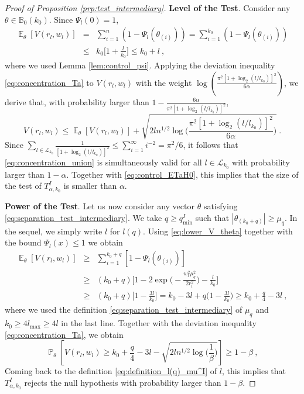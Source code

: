 \documentclass[twoside,11pt]{article}
\def\beq{\begin{equation}}
\def\eeq{\end{equation}}
\def\cL{\mathcal{L}}
\newcommand{\E}{\operatorname{\mathbb{E}}}
\renewcommand{\P}{\operatorname{\mathbb{P}}}
\newcommand{\<}{\langle}
\renewcommand{\>}{\rangle}
\begin{document}
\begin{proof}[Proof of Proposition \ref{prp:test_intermediary}]
\bigskip
\noindent 
  {\bf Level of the Test}. Consider  any $\theta\in \mathbb{B}_0(k_0)$. Since $\Psi_l(0)=1$, 
\begin{eqnarray}
\nonumber
\label{eq:control_ETaH0}
 \E_{\theta}[V(r_{l},w_l)]&=& \sum_{i=1}^{n}(1- \Psi_l(\theta_{(i)})) = \sum_{i=1}^{k_0}(1- \Psi_l(\theta_{(i)}))\\
 &\leq& k_0\big[1+ \frac{l}{k_0}\big]\leq k_0 + l \ ,
\end{eqnarray}
where we used Lemma \ref{lem:control_psi}.
Applying the deviation inequality \eqref{eq:concentration_Ta} to $V(r_{l},w_l)$ with the weight $\log(\frac{\pi^2 [1+\log_2(l/l_{k_0})]^2}{6\alpha})$, we derive that, with probability larger than $1-\frac{6\alpha}{\pi^2[1+\log_2(l/l_{k_0})]^2}$, 
\beq\label{eq:concentration_union}
 V(r_{l},w_l) \leq  \E_{\theta }[V(r_{l},w_l) ] +  \sqrt{2ln^{1/2}\log\Big(\frac{\pi^2 [1+\log_2(l/l_{k_0})]^2}{6\alpha}\Big)} \ .
\eeq
Since $\sum_{l\in \cL_{k_0}}\frac{1}{[1+\log_2(l/l_{k_0})]^2}\leq \sum_{i=1}^{\infty} i^{-2}= \pi^2/6$, it follows that \eqref{eq:concentration_union} is simultaneously  valid for all $l\in \cL_{k_0}$ with probability larger than $1-\alpha$. Together with \eqref{eq:control_ETaH0}, this implies that the size of the test of $T_{\alpha,k_0}^{I}$ is smaller than $\alpha$.

\bigskip
\noindent 
  {\bf Power of the Test}.
Let us now consider any vector $\theta$ satisfying \eqref{eq:separation_test_intermediary}. We take $q\geq q_{\min}^{I}$ such that $|\theta_{(k_0+q)}|\geq \mu_{q}$. In the sequel, we simply write $l$ for $l(q)$. 
Using \eqref{eq:lower_V_theta} together with the bound $\Psi_{l}(x)\leq 1$ we obtain
\begin{eqnarray}
\nonumber
\E_{\theta}[V(r_{l},w_l)]&\geq& \sum_{i=1}^{k_0+q} [1- \Psi_{l}(\theta_{(i)})]
\\ \nonumber
&\geq &(k_0+ q) \Big[1- 2\exp\Big(- \frac{w_l^2\mu_{q}^2}{2r_{l}^2}\Big)- \frac{l}{k_0} \Big]\\ 
&\geq & (k_0+q)\Big[ 1 - \frac{3l}{k_0} \Big]= k_0 -  3l + q\Big(1-\frac{3l}{k_0}\Big) \geq k_0 + \frac{q}{4}-3l \ , 
\label{eq:control_ETaH1} 
\end{eqnarray}
where we used the definition \eqref{eq:separation_test_intermediary} of $\mu_{q}$ and $k_0\geq 4l_{\max}\geq 4l$ in the last line. Together with the deviation inequality \eqref{eq:concentration_Ta}, we obtain
\beq\label{eq:concentration_alternative}
 \P_{\theta}\left[V(r_{l},w_l) \geq  k_0 + \frac{q}{4}- 3l -  \sqrt{2ln^{1/2}\log\Big(\frac{1}{\beta}\Big)}\right]\geq 1-\beta \ , 
\eeq
 Coming back to the definition \eqref{eq:definition_l(q)_mu^I} of $l$, this implies that $T_{\alpha,k_0}^{I}$ rejects the null hypothesis with probability larger than $1-\beta$.

\end{proof}
\end{document}
